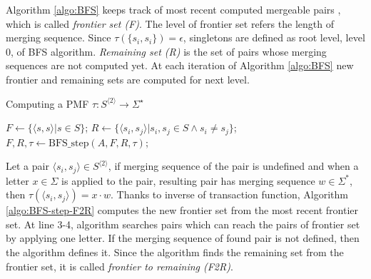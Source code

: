 \documentclass[12pt]{article}
\begin{document}
Algorithm \ref{algo:BFS} keeps track of most recent computed mergeable pairs , which is called \textit{frontier set (F)}. The level of frontier set refers the length of merging sequence. Since $\tau(\{ s_i, s_i \})=\epsilon$, singletons are defined as root level, level 0, of BFS algorithm. \textit{Remaining set (R)} is the set of pairs whose merging sequences are not computed yet. At each iteration of Algorithm \ref{algo:BFS} new frontier and remaining sets are computed for next level. 


\renewcommand{\baselinestretch}{0.9}
\begin{algorithm}
	\label{algo:BFS}
	\caption{Computing a PMF $\tau : S^{\langle 2 \rangle} \rightarrow \Sigma^\star$}
	
	
	$F \longleftarrow \{ \langle s,s\rangle | s \in S \}$; 
    $R \longleftarrow \{ \langle s_i,s_j\rangle | s_i,s_j \in S \wedge s_i \neq s_j \}$; 
	{
		$F,R,\tau \longleftarrow \mbox{BFS\_step}(A,F,R,\tau)$;\\
	}
\end{algorithm}
\renewcommand{\baselinestretch}{1}

Let a pair $\langle s_i,s_j \rangle \in S^{\langle 2 \rangle}$, if merging sequence of the pair is undefined and when a letter $x \in \Sigma$ is applied to the pair, resulting pair has merging sequence $w \in \Sigma^*$, then $\tau(\langle s_i,s_j \rangle) = x \cdot w$. Thanks to inverse of transaction function, Algorithm \ref{algo:BFS-step-F2R} computes the new frontier set from the most recent frontier set. At line 3-4, algorithm searches pairs which can reach the pairs of frontier set by applying one letter. If the merging sequence of found pair is not defined, then the algorithm defines it. Since the algorithm finds the remaining set from the frontier set, it is called \textit{frontier to remaining (F2R)}. 
\end{document}
